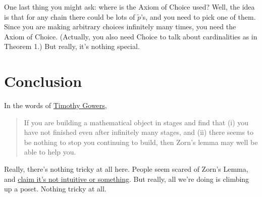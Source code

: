 One last thing you might ask:
where is the Axiom of Choice used?
Well, the idea is that for any chain there could be lots of $\tilde p$'s,
and you need to pick one of them.
Since you are making arbitrary choices infinitely many times, you need the Axiom of Choice.
(Actually, you also need Choice to talk about cardinalities as in Theorem 1.)
But really, it's nothing special.

\section{Conclusion}
In the words of \href{https://gowers.wordpress.com/2008/08/12/how-to-use-zorns-lemma/}{Timothy Gowers},
\begin{quote}
If you are building a mathematical object in stages and find that (i) you have not finished even after infinitely many stages, and (ii) there seems to be nothing to stop you continuing to build, then Zorn's lemma may well be able to help you.
\end{quote}
Really, there's nothing tricky at all here.
People seem scared of Zorn's Lemma,
and \href{http://math.stackexchange.com/questions/251726/simple-and-intuitive-example-for-zorns-lemma}{claim it's not intuitive or something}.
But really, all we're doing is climbing up a poset.
Nothing tricky at all.
